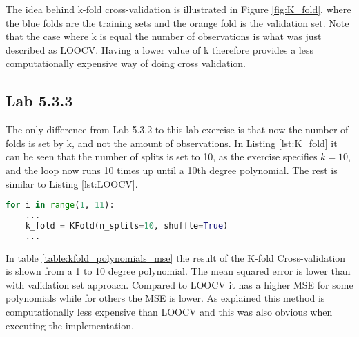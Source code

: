 
The idea behind k-fold cross-validation is illustrated in Figure \ref{fig:K_fold}, where the blue folds are the training sets and the orange fold is the validation set. Note that the case where k is equal the number of observations is what was just described as LOOCV. Having a lower value of k therefore provides a less computationally expensive way of doing cross validation.

\FloatBarrier
\subsection{Lab 5.3.3}
The only difference from Lab 5.3.2 to this lab exercise is that now the number of folds is set by k, and not the amount of observations. In Listing \ref{lst:K_fold} it can be seen that the number of splits is set to 10, as the exercise specifies $k=10$, and the loop now runs 10 times up until a 10th degree polynomial. The rest is similar to Listing \ref{lst:LOOCV}.

\begin{lstlisting}[language=Python, label=lst:K_fold, caption=K-fold Cross-validation loop]
for i in range(1, 11):
	...
	k_fold = KFold(n_splits=10, shuffle=True) 
	...
\end{lstlisting}
\FloatBarrier

In table \ref{table:kfold_polynomials_mse} the result of the K-fold Cross-validation is shown from a 1 to 10 degree polynomial. The mean squared error is lower than with validation set approach. Compared to LOOCV it has a higher MSE for some polynomials while for others the MSE is lower. As explained this method is computationally less expensive than LOOCV and this was also obvious when executing the implementation.


